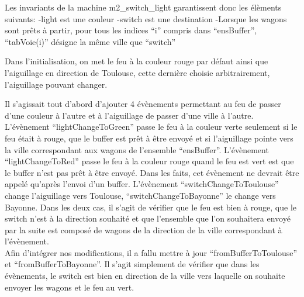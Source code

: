 Les invariants de la machine m2\_switch\_light garantissent donc les élèments suivants:
    -light est une couleur
    -switch est une destination
    -Lorsque les wagons sont prêts à partir, pour tous les indices ``i'' compris dans ``ensBuffer'', ``tabVoie(i)'' désigne la même ville
    que ``switch''

Dans l'initialisation, on met le feu à la couleur rouge par défaut ainsi que l'aiguillage en direction de Toulouse, cette dernière choisie
arbitrairement, l'aiguillage pouvant changer.

Il s'agissait tout d'abord d'ajouter 4 évènements permettant au feu de passer d'une couleur à l'autre et à l'aiguillage de passer d'une ville à
l'autre.
L'évènement ``lightChangeToGreen'' passe le feu à la couleur verte seulement si le feu était à rouge, que le buffer est prêt à être envoyé
et si l'aiguillage pointe vers la ville correspondant aux wagons de l'ensemble ``ensBuffer''.
L'évènement ``lightChangeToRed'' passe le feu à la couleur rouge quand le feu est vert est que le buffer n'est pas prêt à être envoyé. Dans les
faits, cet évènement ne devrait être appelé qu'après l'envoi d'un buffer.
L'évènement ``switchChangeToToulouse'' change l'aiguillage vers Toulouse, ``switchChangeToBayonne'' le change vers Bayonne. Dans les deux cas,
il s'agit de vérifier que le feu est bien à rouge, que le switch n'est à la direction souhaité et que l'ensemble que l'on souhaitera envoyé par
la suite est composé de wagons de la direction de la ville correspondant à l'évènement.
\\
Afin d'intégrer nos modifications, il a fallu mettre à jour ``fromBufferToToulouse'' et ``fromBufferToBayonne''. Il s'agit simplement de vérifier
que dans les évènements, le switch est bien en direction de la ville vers laquelle on souhaite envoyer les wagons et le feu au vert.

